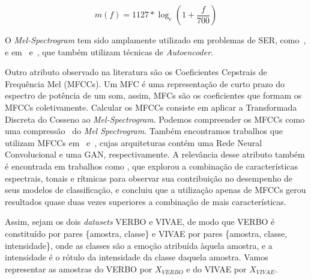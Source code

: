 \begin{equation}
    m(f) = 1127 * \log_e{(1 + \frac{f}{700})}
\end{equation}

O \textit{Mel-Spectrogram} tem sido amplamente utilizado em problemas de \acrshort{SER}, como~\cite{32.25, 32.30}, e em~\cite{32.31} e~\cite{32.32}, que também utilizam técnicas de \textit{Autoencoder}. 

Outro atributo observado na literatura são os Coeficientes Cepstrais de Frequência Mel (\acrshort{MFCC}s). Um \acrshort{MFC} é uma representação de curto prazo do espectro de potência de um som, assim, \acrshort{MFC}s são os coeficientes que formam os \acrshort{MFCC}s coletivamente. Calcular os \acrshort{MFCC}s consiste em aplicar a Transformada Discreta do Cosseno ao \textit{Mel-Spectrogram}. Podemos compreender os \acrshort{MFCC}s como uma compressão~\cite{64} do \textit{Mel Spectrogram}. Também encontramos trabalhos que utilizam \acrshort{MFCC}s em~\cite{32.79} e~\cite{32.89}, cujas arquiteturas contém uma Rede Neural Convolucional e uma \acrshort{GAN}, respectivamente. A relevância desse atributo também é encontrada em trabalhos como \cite{11}, que explorou a combinação de características espectrais, tonais e rítmicas para observar sua contribuição no desempenho de seus modelos de classificação, e concluiu que a utilização apenas de \acrshort{MFCC}s gerou resultados quase duas vezes superiores a combinação de mais características.





Assim, sejam os dois \textit{datasets} VERBO e VIVAE, de modo que VERBO é constituído por pares \{amostra, classe\} e VIVAE por pares \{amostra, classe, intensidade\}, onde as classes são a emoção atribuída àquela amostra, e a intensidade é o rótulo da intensidade da classe daquela amostra. Vamos representar as amostras do VERBO por $X_{VERBO}$ e do VIVAE por $X_{VIVAE}$.

